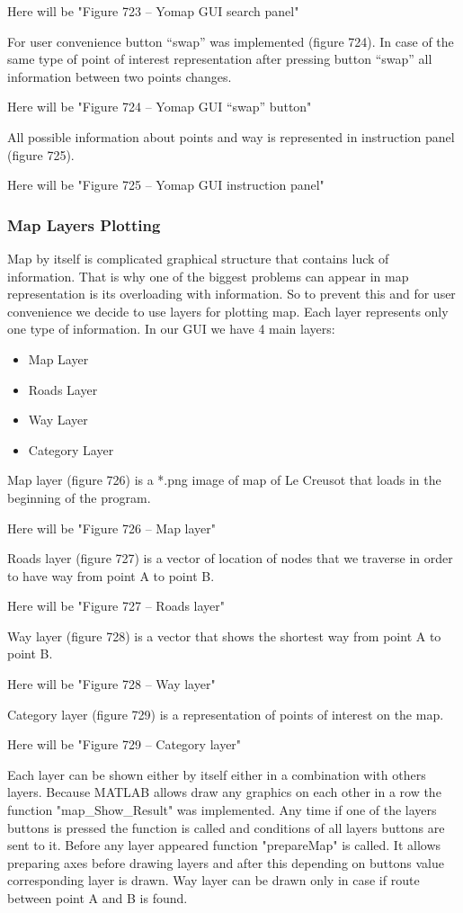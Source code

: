 			Here will be "Figure 723 – Yomap GUI search panel"
			
			For user convenience button “swap” was implemented (figure 724). In case of the same type of point of interest representation after pressing button “swap” all information between two points changes.  
			
			Here will be "Figure 724 – Yomap GUI “swap” button"
			
			All possible information about points and way is represented in instruction panel (figure 725). 
			
			Here will be "Figure 725 – Yomap GUI instruction panel"
			
		\subsubsection{Map Layers Plotting}
		Map by itself is complicated graphical structure that contains luck of information. That is why one of the biggest problems can appear in map representation is its overloading with information. So to prevent this and for user convenience we decide to use layers for plotting map. 
		Each layer represents only one type of information. In our GUI we have 4 main layers:
		\begin{itemize}
			\item Map Layer
			\item Roads Layer
			\item Way Layer
			\item Category Layer
		\end{itemize}
		
		Map layer (figure 726) is a *.png image of map of Le Creusot that loads in the beginning of the program. 
		
		Here will be "Figure 726 – Map layer"
		
		Roads layer (figure 727) is a vector of location of nodes that we traverse in order to have way from point A to point B.
		
		Here will be "Figure 727 – Roads layer"
		
		Way layer (figure 728) is a vector that shows the shortest way from point A to point B.
		
		Here will be "Figure 728 – Way layer"
		
		Category layer (figure 729) is a representation of points of interest on the map.
		
		Here will be "Figure 729 – Category layer"
		
		Each layer can be shown either by itself either in a combination with others layers. Because MATLAB allows draw any graphics on each other in a row the function "map\_Show\_Result" was implemented. Any time if one of the layers buttons is pressed the function is called and conditions of all layers buttons are sent to it. Before any layer appeared function "prepareMap" is called. It allows preparing axes before drawing layers and after this depending on buttons value corresponding layer is drawn. Way layer can be drawn only in case if route between point A and B is found.
		
